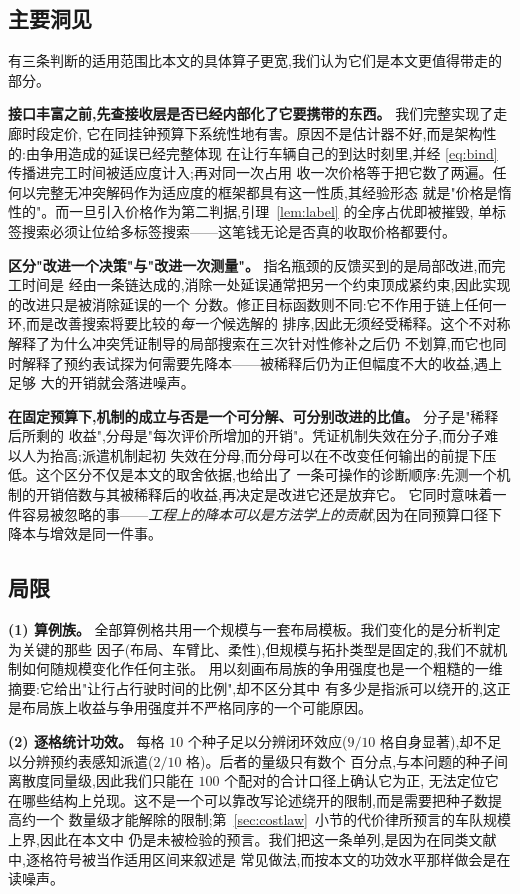 \documentclass[manuscript,screen,review]{acmart}
\newcommand{\NCases}{10}
\newcommand{\NSeeds}{10}
\newcommand{\NPairs}{100}
\newcommand{\CellsSigLoop}{9}
\newcommand{\CellsSigProbe}{2}
\begin{document}
\subsection{主要洞见}
\label{sec:insights}

有三条判断的适用范围比本文的具体算子更宽,我们认为它们是本文更值得带走的部分。

\textbf{接口丰富之前,先查接收层是否已经内部化了它要携带的东西。} 我们完整实现了走廊时段定价,
它在同挂钟预算下系统性地有害。原因不是估计器不好,而是架构性的:由争用造成的延误已经完整体现
在让行车辆自己的到达时刻里,并经 \eqref{eq:bind} 传播进完工时间被适应度计入;再对同一次占用
收一次价格等于把它数了两遍。任何以完整无冲突解码作为适应度的框架都具有这一性质,其经验形态
就是"价格是惰性的"。而一旦引入价格作为第二判据,引理~\ref{lem:label} 的全序占优即被摧毁,
单标签搜索必须让位给多标签搜索——这笔钱无论是否真的收取价格都要付。

\textbf{区分"改进一个决策"与"改进一次测量"。} 指名瓶颈的反馈买到的是局部改进,而完工时间是
经由一条链达成的,消除一处延误通常把另一个约束顶成紧约束,因此实现的改进只是被消除延误的一个
分数。修正目标函数则不同:它不作用于链上任何一环,而是改善搜索将要比较的\emph{每一个}候选解的
排序,因此无须经受稀释。这个不对称解释了为什么冲突凭证制导的局部搜索在三次针对性修补之后仍
不划算,而它也同时解释了预约表试探为何需要先降本——被稀释后仍为正但幅度不大的收益,遇上足够
大的开销就会落进噪声。

\textbf{在固定预算下,机制的成立与否是一个可分解、可分别改进的比值。} 分子是"稀释后所剩的
收益",分母是"每次评价所增加的开销"。凭证机制失效在分子,而分子难以人为抬高;派遣机制起初
失效在分母,而分母可以在不改变任何输出的前提下压低。这个区分不仅是本文的取舍依据,也给出了
一条可操作的诊断顺序:先测一个机制的开销倍数与其被稀释后的收益,再决定是改进它还是放弃它。
它同时意味着一件容易被忽略的事——\emph{工程上的降本可以是方法学上的贡献},因为在同预算口径下
降本与增效是同一件事。

\subsection{局限}
\label{sec:limitations}

\textbf{(1) 算例族。} 全部算例格共用一个规模与一套布局模板。我们变化的是分析判定为关键的那些
因子(布局、车臂比、柔性),但规模与拓扑类型是固定的,我们不就机制如何随规模变化作任何主张。
用以刻画布局族的争用强度也是一个粗糙的一维摘要:它给出"让行占行驶时间的比例",却不区分其中
有多少是指派可以绕开的,这正是布局族上收益与争用强度并不严格同序的一个可能原因。

\textbf{(2) 逐格统计功效。} 每格 $\NSeeds$ 个种子足以分辨闭环效应($\CellsSigLoop/\NCases$
格自身显著),却不足以分辨预约表感知派遣($\CellsSigProbe/\NCases$ 格)。后者的量级只有数个
百分点,与本问题的种子间离散度同量级,因此我们只能在 $\NPairs$ 个配对的合计口径上确认它为正,
无法定位它在哪些结构上兑现。这不是一个可以靠改写论述绕开的限制,而是需要把种子数提高约一个
数量级才能解除的限制;第~\ref{sec:costlaw}~小节的代价律所预言的车队规模上界,因此在本文中
仍是未被检验的预言。我们把这一条单列,是因为在同类文献中,逐格符号被当作适用区间来叙述是
常见做法,而按本文的功效水平那样做会是在读噪声。
\end{document}
